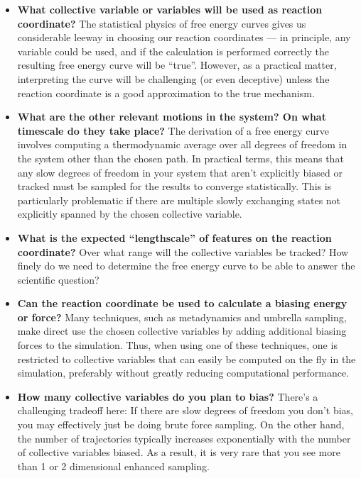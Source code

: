 \begin{itemize}

    \item \textbf{What collective variable or variables will be used as reaction
    coordinate?}  The statistical physics of free energy curves gives us
    considerable leeway in choosing our reaction coordinates --- in principle,
    any variable could be used, and if the calculation is performed correctly
    the resulting free energy curve will be ``true''.  However, as a practical
    matter, interpreting the curve will be challenging (or even deceptive)
    unless the reaction coordinate is a good approximation to the true
    mechanism.

    \item \textbf{What are the other relevant motions in the system? On what
    timescale do they take place?}  The derivation of a free energy curve
    involves computing a thermodynamic average over all degrees of freedom in
    the system other than the chosen path.  In practical terms, this means that
    any slow degrees of freedom in your system that aren't explicitly biased or
    tracked must be sampled for the results to converge statistically.  This is
    particularly problematic if there are multiple slowly exchanging states not
    explicitly spanned by the chosen collective variable.

    \item \textbf{What is the expected ``lengthscale'' of features on the
    reaction coordinate?}  Over what range will the collective variables be
    tracked? How finely do we need to determine the free energy curve to be able
    to answer the scientific question?

    \item \textbf{Can the reaction coordinate be used to calculate a biasing
    energy or force? }  Many techniques, such as metadynamics and umbrella
    sampling, make direct use the chosen collective variables by adding
    additional biasing forces to the simulation.  Thus, when using one of these
    techniques, one is restricted to collective variables that can easily be
    computed on the fly in the simulation, preferably without greatly reducing
    computational performance.

    \item \textbf{How many collective variables do you plan to bias?} There's a
    challenging tradeoff here: If there are slow degrees of freedom you don't
    bias, you may effectively just be doing brute force sampling.  On the other
    hand, the number of trajectories typically increases exponentially with the
    number of collective variables biased.  As a result, it is very rare that you see more than 1 or 2 dimensional enhanced sampling.


\end{itemize}

